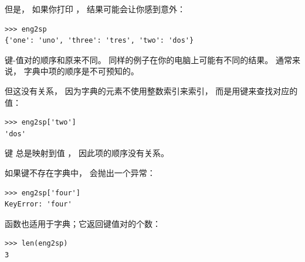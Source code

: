 但是， 如果你打印  ， 结果可能会让你感到意外：

\begin{lstlisting}
>>> eng2sp
{'one': 'uno', 'three': 'tres', 'two': 'dos'}
\end{lstlisting}

%

键-值对的顺序和原来不同。
同样的例子在你的电脑上可能有不同的结果。  通常来说， 字典中项的顺序是不可预知的。


但这没有关系， 因为字典的元素不使用整数索引来索引， 而是用键来查找对应的值：

\begin{lstlisting}
>>> eng2sp['two']
'dos'
\end{lstlisting}

%

键  总是映射到值  ， 因此项的顺序没有关系。


如果键不存在字典中， 会抛出一个异常：

  

\begin{lstlisting}
>>> eng2sp['four']
KeyError: 'four'
\end{lstlisting}

%

 函数也适用于字典；它返回键值对的个数：

  

\begin{lstlisting}
>>> len(eng2sp)
3
\end{lstlisting}

%

